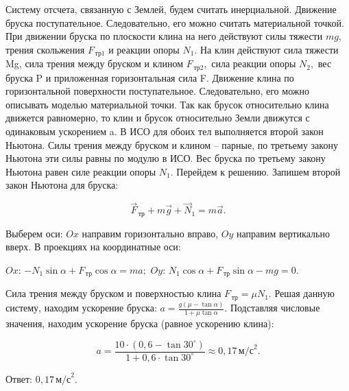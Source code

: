 \documentclass[12pt,a4paper]{article}
\begin{document}
{Систему отсчета, связанную с Землей, будем считать инерциальной. Движение бруска поступательное. Следовательно, его можно считать материальной точкой. 
При движении бруска по плоскости клина на него действуют силы тяжести $mg$, трения скольжения $F_{\,\text{тр}1}$  и реакции опоры $N_1.$ На клин действуют сила тяжести Mg, сила трения между бруском и клином $F_{\,\text{тр}2},$ сила реакции опоры $N_2,$ вес бруска P и приложенная горизонтальная сила F. Движение клина по горизонтальной поверхности поступательное. Следовательно, его можно описывать моделью материальной точки.
Так как брусок относительно клина движется равномерно, то клин и брусок относительно Земли движутся с одинаковым ускорением a. В ИСО для обоих тел выполняется второй закон Ньютона.
Силы трения между бруском и клином – парные, по третьему закону Ньютона эти силы равны по модулю в ИСО. Вес бруска по третьему закону Ньютона равен силе реакции опоры $N_{1}$.
Перейдем к решению.
Запишем второй закон Ньютона для бруска:

\[\vec F_{\,\text{тр}} + m\vec g + \vec N_1=m\vec a.\]

Выберем оси: $Ox$ направим горизонтально вправо, $Oy$ направим вертикально вверх. В проекциях на координатные оси:

$Ox$: $- N_1 \sin \alpha + F_{\,\text{тр}} \cos \alpha =ma;$
$Oy$: $N_1 \cos \alpha + F_{\,\text{тр}} \sin \alpha - mg=0.$

Сила трения между бруском и поверхностью клина $F_{\,\text{тр}}=\mu N_1.$
Решая данную систему, находим ускорение бруска: $a= \frac{g ( \mu - \tan \alpha )}{1 + \mu \tan \alpha} .$
Подставляя числовые значения, находим ускорение бруска (равное ускорению клина):

\[a= \frac{10 \cdot ( 0{,}6 - \tan 30 ^\circ )}{1 + 0{,}6 \cdot \tan 30 ^\circ} \approx 0{,}17 \,\text{м/с} ^2 .\]

Ответ: $0{,}17\,\text{м/с}^{2}$.
}
\end{document}
